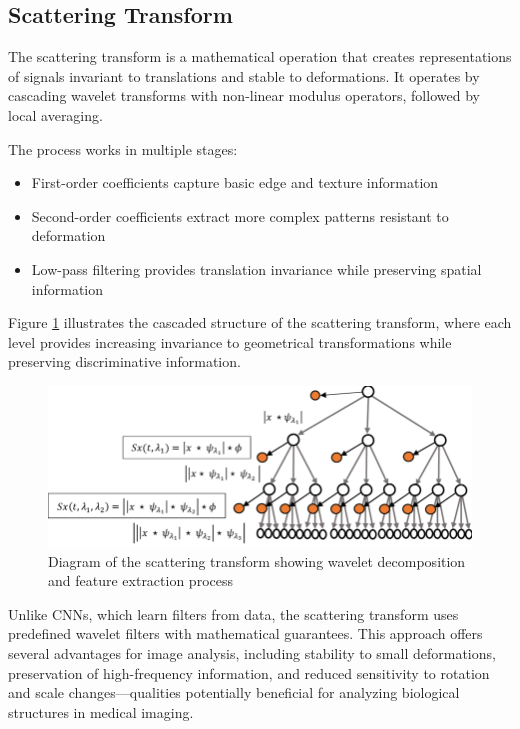 \documentclass[10pt,twocolumn]{article}
\begin{document}
\subsection{Scattering Transform}
The scattering transform is a mathematical operation that creates representations of signals invariant to translations and stable to deformations. It operates by cascading wavelet transforms with non-linear modulus operators, followed by local averaging.

The process works in multiple stages:
\begin{itemize}
    \item First-order coefficients capture basic edge and texture information
    \item Second-order coefficients extract more complex patterns resistant to deformation
    \item Low-pass filtering provides translation invariance while preserving spatial information
\end{itemize}

Figure \ref{fig:scat_transform} illustrates the cascaded structure of the scattering transform, where each level provides increasing invariance to geometrical transformations while preserving discriminative information.

\begin{figure}[h]
\centering
\includegraphics[width=0.9\columnwidth]{imgs/scat_transform.png}
\caption{Diagram of the scattering transform showing wavelet decomposition and feature extraction process}
\label{fig:scat_transform}
\end{figure}

Unlike CNNs, which learn filters from data, the scattering transform uses predefined wavelet filters with mathematical guarantees. This approach offers several advantages for image analysis, including stability to small deformations, preservation of high-frequency information, and reduced sensitivity to rotation and scale changes—qualities potentially beneficial for analyzing biological structures in medical imaging.
\end{document}
